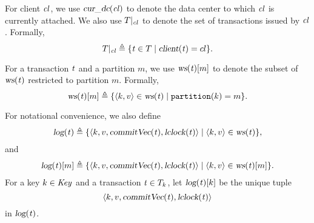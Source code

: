 For client $\mathit{cl}$, we use $\textsl{cur\_dc}(\mathit{cl})$ to denote the data center
to which $\mathit{cl}$ is currently attached.
We also use $T|_{\mathit{cl}}$ to denote the set of transactions issued by $\mathit{cl}$.
Formally,
\[
  T|_{\mathit{cl}} \triangleq \{\mathit{t} \in T \mid \textsl{client}(\mathit{t}) = cl\}.
\]

For a transaction $\mathit{t}$ and a partition $m$,
we use $\textsl{ws}(\mathit{t})[m]$ to denote the subset of $\textsl{ws}(\mathit{t})$
restricted to partition $m$.
Formally,
\[
  \textsl{ws}(\mathit{t})[m] \triangleq \{\langle k, v \rangle \in \textsl{ws}(\mathit{t})
  \mid \mathtt{partition}(k) = m\}.
\]

For notational convenience, we also define
\begin{align*}
  \textsl{log}(\mathit{t}) \triangleq \{\langle k, v, \textsl{commitVec}(\mathit{t}), \textsl{lclock}(\mathit{t})
    \rangle \mid \langle k, v \rangle \in \textsl{ws}(\mathit{t})\},
\end{align*}
and
\begin{align*}
  \textsl{log}(\mathit{t})[m] \triangleq \{\langle k, v, \textsl{commitVec}(\mathit{t}), \textsl{lclock}(\mathit{t})
    \rangle \mid \langle k, v \rangle \in \textsl{ws}(\mathit{t})[m]\}.
\end{align*}
For a key $k \in \mathit{Key}$ and a transaction $\mathit{t} \in T_{k}$,
let $\textsl{log}(\mathit{t})[k]$ be the unique tuple
\[
  \langle k, v, \textsl{commitVec}(\mathit{t}), \textsl{lclock}(\mathit{t}) \rangle
\]
in $\textsl{log}(\mathit{t})$.
